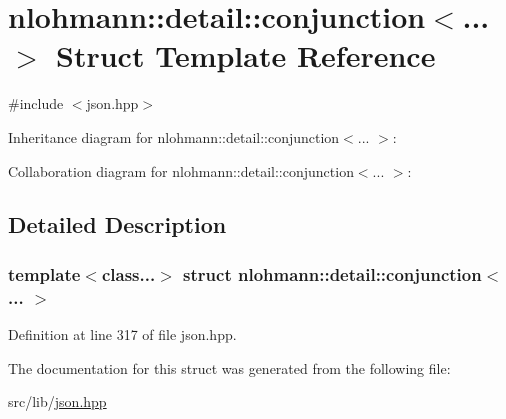 \hypertarget{structnlohmann_1_1detail_1_1conjunction}{}\section{nlohmann\+:\+:detail\+:\+:conjunction$<$... $>$ Struct Template Reference}
\label{structnlohmann_1_1detail_1_1conjunction}


{\ttfamily \#include $<$json.\+hpp$>$}



Inheritance diagram for nlohmann\+:\+:detail\+:\+:conjunction$<$... $>$\+:


Collaboration diagram for nlohmann\+:\+:detail\+:\+:conjunction$<$... $>$\+:


\subsection{Detailed Description}
\subsubsection*{template$<$class...$>$\newline
struct nlohmann\+::detail\+::conjunction$<$... $>$}



Definition at line 317 of file json.\+hpp.



The documentation for this struct was generated from the following file\+:\begin{DoxyCompactItemize}
\item 
src/lib/\hyperlink{json_8hpp}{json.\+hpp}\end{DoxyCompactItemize}
